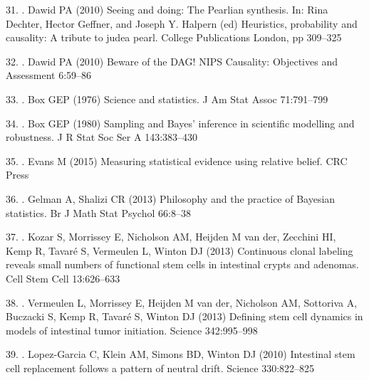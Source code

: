 \documentclass[10pt,letterpaper]{article}
\providecommand{\DIFaddtex}[1]{{\protect\color{blue} \sf #1}} %
\providecommand{\DIFdeltex}[1]{{\protect\color{red} \scriptsize #1}} %
\providecommand{\DIFaddbegin}{} %
\providecommand{\DIFaddend}{} %
\providecommand{\DIFdelbegin}{} %
\providecommand{\DIFdelend}{} %
\providecommand{\DIFadd}[1]{\texorpdfstring{\DIFaddtex{#1}}{#1}} %
\providecommand{\DIFdel}[1]{\texorpdfstring{\DIFdeltex{#1}}{}} %
\begin{document}
\hypertarget{ref-Dawid2010-ab}{}
\DIFdelbegin \DIFdel{31. }\DIFdelend \DIFaddbegin \DIFadd{26. }\DIFaddend Dawid PA (2010) Seeing and doing: The Pearlian synthesis. In: Rina
Dechter, Hector Geffner, and Joseph Y. Halpern (ed) Heuristics,
probability and causality: A tribute to judea pearl. College
Publications London, pp 309--325

\hypertarget{ref-Dawid2010-yg}{}
\DIFdelbegin \DIFdel{32. }\DIFdelend \DIFaddbegin \DIFadd{27. }\DIFaddend Dawid PA (2010) Beware of the DAG! NIPS Causality: Objectives and
Assessment 6:59--86

\hypertarget{ref-Box1976-he}{}
\DIFdelbegin \DIFdel{33. }\DIFdelend \DIFaddbegin \DIFadd{28. }\DIFaddend Box GEP (1976) Science and statistics. J Am Stat Assoc 71:791--799

\hypertarget{ref-Box1980-ch}{}
\DIFdelbegin \DIFdel{34. }\DIFdelend \DIFaddbegin \DIFadd{29. }\DIFaddend Box GEP (1980) Sampling and Bayes' inference in scientific modelling
and robustness. J R Stat Soc Ser A 143:383--430

\hypertarget{ref-Evans2015-kg}{}
\DIFdelbegin \DIFdel{35. }\DIFdelend \DIFaddbegin \DIFadd{30. }\DIFaddend Evans M (2015) Measuring statistical evidence using relative belief.
CRC Press

\hypertarget{ref-Gelman2013-wc}{}
\DIFdelbegin \DIFdel{36. }\DIFdelend \DIFaddbegin \DIFadd{31. }\DIFaddend Gelman A, Shalizi CR (2013) Philosophy and the practice of Bayesian
statistics. Br J Math Stat Psychol 66:8--38

\hypertarget{ref-Kozar2013-mr}{}
\DIFdelbegin \DIFdel{37. }\DIFdelend \DIFaddbegin \DIFadd{32. }\DIFaddend Kozar S, Morrissey E, Nicholson AM, Heijden M van der, Zecchini HI,
Kemp R, Tavaré S, Vermeulen L, Winton DJ (2013) Continuous clonal
labeling reveals small numbers of functional stem cells in intestinal
crypts and adenomas. Cell Stem Cell 13:626--633

\hypertarget{ref-Vermeulen2013-ew}{}
\DIFdelbegin \DIFdel{38. }\DIFdelend \DIFaddbegin \DIFadd{33. }\DIFaddend Vermeulen L, Morrissey E, Heijden M van der, Nicholson AM, Sottoriva
A, Buczacki S, Kemp R, Tavaré S, Winton DJ (2013) Defining stem cell
dynamics in models of intestinal tumor initiation. Science 342:995--998

\hypertarget{ref-Lopez-Garcia2010-bv}{}
\DIFdelbegin \DIFdel{39. }\DIFdelend \DIFaddbegin \DIFadd{34. }\DIFaddend Lopez-Garcia C, Klein AM, Simons BD, Winton DJ (2010) Intestinal
stem cell replacement follows a pattern of neutral drift. Science
330:822--825
\end{document}
